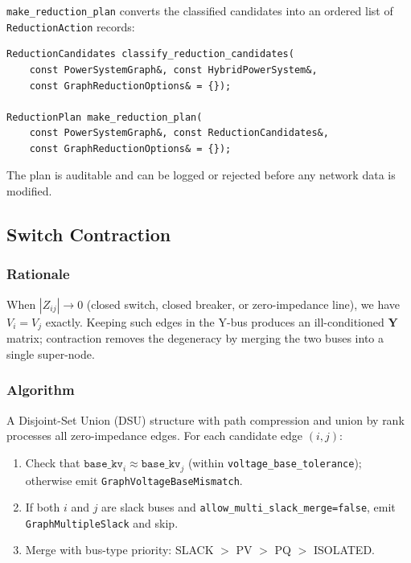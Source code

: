 \texttt{make\_reduction\_plan} converts the classified candidates into an
ordered list of \texttt{ReductionAction} records:

\begin{verbatim}
ReductionCandidates classify_reduction_candidates(
    const PowerSystemGraph&, const HybridPowerSystem&,
    const GraphReductionOptions& = {});

ReductionPlan make_reduction_plan(
    const PowerSystemGraph&, const ReductionCandidates&,
    const GraphReductionOptions& = {});
\end{verbatim}

The plan is auditable and can be logged or rejected before any network data
is modified.

\subsection{Switch Contraction}
\label{sec:graph-contraction}

\subsubsection{Rationale}

When $|Z_{ij}| \to 0$ (closed switch, closed breaker, or zero-impedance
line), we have $V_i = V_j$ exactly.  Keeping such edges in the Y-bus
produces an ill-conditioned $\mathbf{Y}$ matrix; contraction removes the
degeneracy by merging the two buses into a single super-node.

\subsubsection{Algorithm}

A Disjoint-Set Union (DSU) structure with path compression and union by rank
processes all zero-impedance edges.  For each candidate edge $(i,j)$:

\begin{enumerate}
  \item Check that $\texttt{base\_kv}_i \approx \texttt{base\_kv}_j$ (within
        \texttt{voltage\_base\_tolerance}); otherwise emit
        \texttt{GraphVoltageBaseMismatch}.
  \item If both $i$ and $j$ are slack buses and
        \texttt{allow\_multi\_slack\_merge=false}, emit
        \texttt{GraphMultipleSlack} and skip.
  \item Merge with bus-type priority: SLACK $>$ PV $>$ PQ $>$ ISOLATED.
\end{enumerate}

